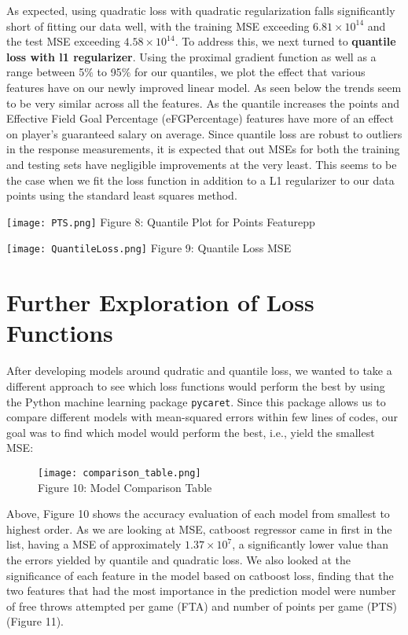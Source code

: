 \documentclass{article}
\begin{document}
As expected, using quadratic loss with quadratic regularization falls significantly short of fitting our data well, with the training MSE exceeding $6.81\times10^{14}$ and the test MSE exceeding $4.58\times10^{14}$. To address this, we next turned to \textbf{quantile loss with l1 regularizer}. Using the proximal gradient function as well as a range between 5$\%$ to 95$\%$ for our quantiles, we plot the effect that various features have on our newly improved linear model. As seen below the trends seem to be very similar across all the features. 
As the quantile increases the points and Effective Field Goal Percentage (eFGPercentage) features have more of an effect on player's guaranteed salary on average. Since quantile loss are robust to outliers in the response measurements, it is expected that out MSEs for both the training and testing sets have negligible improvements at the very least. This seems to be the case when we fit the loss function in addition to a L1 regularizer to our data points using the standard least squares method.

\begin{minipage}[b]{0.3\textwidth}
    \texttt{[image: PTS.png]}
    Figure 8: Quantile Plot for Points Featurepp
  \end{minipage}
 \hfill
\begin{minipage}[b]{0.45\textwidth}
    \texttt{[image: QuantileLoss.png]}
    Figure 9: Quantile Loss MSE
  \end{minipage}

\section{Further Exploration of Loss Functions}
After developing models around qudratic and quantile loss, we wanted to take a different approach to see which loss functions would perform the best by using the Python machine learning package \texttt{pycaret}. Since this package allows us to compare different models with mean-squared errors within few lines of codes, our goal was to find which model would perform the best, i.e., yield the smallest MSE:

\begin{figure}[h]
    \centering
    \texttt{[image: comparison\_table.png]}
    \\Figure 10: Model Comparison Table
\end{figure}


Above, Figure 10 shows the accuracy evaluation of each model from smallest to highest order. As we are looking at MSE, catboost regressor came in first in the list, having a MSE of approximately $1.37\times10^7$, a significantly lower value than the errors yielded by quantile and quadratic loss. We also looked at the significance of each feature in the model based on catboost loss, finding that the two features that had the most importance in the prediction model were number of free throws attempted per game (FTA) and number of points per game (PTS) (Figure 11).
\end{document}

